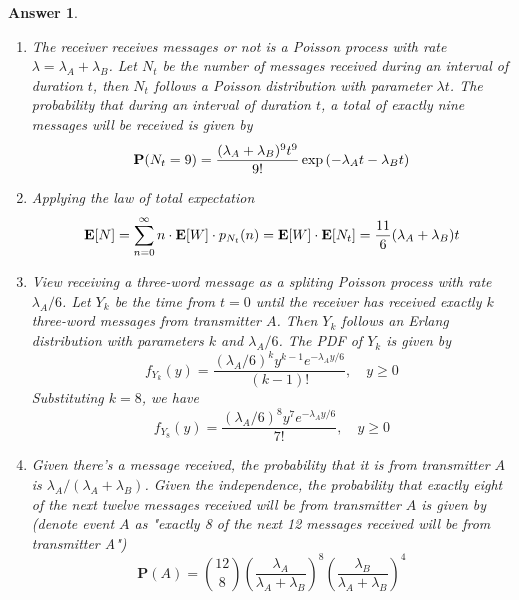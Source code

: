 \documentclass[utf8]{article}
\theoremstyle{definition}%
\theoremstyle{plain}%
\newtheorem{answer}{Answer} %
\begin{document}
\begin{answer} ~
    \begin{enumerate}[label=(\alph*)]
        \item The receiver receives messages or not is a Poisson process with rate $\lambda = \lambda_A + \lambda_B$. Let $N_t$ be the number of messages received during an interval of duration $t$, then $N_t$ follows a Poisson distribution with parameter $\lambda t$. The probability that during an interval of duration $t$, a total of exactly nine messages will be received is given by
        \begin{equation}
            \mathbf{P}(N_t = 9) = \frac{(\lambda_A + \lambda_B)^9 t^9}{9!} \exp\qty(-\lambda_A t - \lambda_B t)
        \end{equation}
        \item Applying the law of total expectation
        \begin{equation}
            \mathbf{E}[N] = \sum_{n=0}^{\infty} n \cdot \mathbf{E}[W] \cdot p_{N_t}(n) = \mathbf{E}[W] \cdot \mathbf{E}[N_t] = \frac{11}{6} \qty(\lambda_A + \lambda_B)t
        \end{equation}
        \item View receiving a three-word message as a spliting Poisson process with rate $\lambda_A / 6$. Let $Y_k$ be the time from $t = 0$ until the receiver has received exactly $k$ three-word messages from transmitter $A$. Then $Y_k$ follows an Erlang distribution with parameters $k$ and $\lambda_A / 6$. The PDF of $Y_k$ is given by
        \begin{equation}
            f_{Y_k}(y) = \frac{(\lambda_A / 6)^k y^{k - 1} e^{-\lambda_A y / 6}}{(k - 1)!}, \quad y \geq 0
        \end{equation}
        Substituting $k = 8$, we have
        \begin{equation}
            f_{Y_8}(y) = \frac{(\lambda_A / 6)^8 y^7 e^{-\lambda_A y / 6}}{7!}, \quad y \geq 0
        \end{equation}
        \item Given there's a message received, the probability that it is from transmitter $A$ is $\lambda_A / (\lambda_A + \lambda_B)$. Given the independence, the probability that exactly eight of the next twelve messages received will be from transmitter $A$ is given by (denote event $A$ as "exactly 8 of the next 12 messages received will be from transmitter A")
        \begin{equation}
            \mathbf{P}(A) = \binom{12}{8} \left(\frac{\lambda_A}{\lambda_A + \lambda_B}\right)^8 \left(\frac{\lambda_B}{\lambda_A + \lambda_B}\right)^4
        \end{equation}
    \end{enumerate}
\end{answer}
\end{document}
